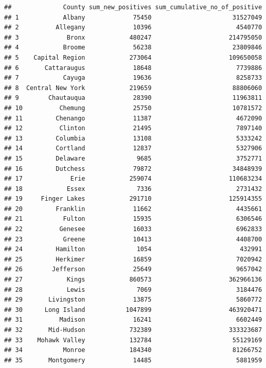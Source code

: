\documentclass[
  12pt,
]{article}
\begin{document}
\begin{verbatim}
##              County sum_new_positives sum_cumulative_no_of_positive
## 1            Albany             75450                      31527049
## 2          Allegany             10396                       4540770
## 3             Bronx            480247                     214795050
## 4            Broome             56238                      23809846
## 5    Capital Region            273064                     109650058
## 6       Cattaraugus             18648                       7739886
## 7            Cayuga             19636                       8258733
## 8  Central New York            219659                      88806060
## 9        Chautauqua             28390                      11963811
## 10          Chemung             25750                      10781572
## 11         Chenango             11387                       4672090
## 12          Clinton             21495                       7897140
## 13         Columbia             13108                       5333242
## 14         Cortland             12837                       5327906
## 15         Delaware              9685                       3752771
## 16         Dutchess             79872                      34848939
## 17             Erie            259074                     110683234
## 18            Essex              7336                       2731432
## 19     Finger Lakes            291710                     125914355
## 20         Franklin             11662                       4435661
## 21           Fulton             15935                       6306546
## 22          Genesee             16033                       6962833
## 23           Greene             10413                       4408700
## 24         Hamilton              1054                        432991
## 25         Herkimer             16859                       7020942
## 26        Jefferson             25649                       9657042
## 27            Kings            860573                     362966136
## 28            Lewis              7069                       3184476
## 29       Livingston             13875                       5860772
## 30      Long Island           1047899                     463920471
## 31          Madison             16241                       6602449
## 32       Mid-Hudson            732389                     333323687
## 33    Mohawk Valley            132784                      55129169
## 34           Monroe            184340                      81266752
## 35       Montgomery             14485                       5881959

\end{verbatim}
\end{document}

